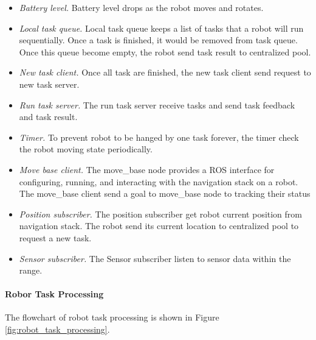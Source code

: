 \begin{itemize}
	\item \textsl{Battery level.} Battery level drops as the robot moves and rotates.
	\item \textsl{Local task queue.} Local task queue keeps a list of tasks that a robot will run sequentially. Once a task is finished, it would be removed from task queue. Once this queue become empty, the robot send task result to centralized pool.
	\item \textsl{New task client.} Once all task are finished, the new task client send request to new task server.
	\item \textsl{Run task server.} The run task server receive tasks and send task feedback and task result.
	\item \textsl{Timer.} To prevent robot to be hanged by one task forever, the timer check the robot moving state periodically.
	\item \textsl{Move base client.} The move\_base node provides a ROS interface for configuring, running, and interacting with the navigation stack on a robot. The move\_base client send a goal to move\_base node to tracking their status  
	\item \textsl{Position subscriber.} The position subscriber get robot current position from navigation stack. The robot send its current location to centralized pool to request a new task.
	\item \textsl{Sensor subscriber.} The Sensor subscriber listen to sensor data within the range.
\end{itemize}

\paragraph{Robor Task Processing} The flowchart of robot task processing is shown in Figure \ref{fig:robot_task_processing}.

